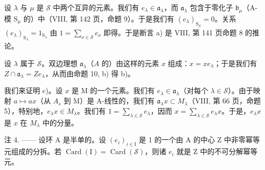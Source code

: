 设 \(\lambda\) 与 \(\mu\) 是 \(\mathcal{S}\) 中两个互异的元素。我们有 \(e_{\lambda} \in \mathfrak{a}_{\lambda}\)，而 \(\mathfrak{a}_{\lambda}\) 包含于零化子 \(\mathfrak{b}_{\mu}\)（A-模 \(\mathrm{S}_{\mu}\) 的）中（VIII, 第 142 页，命题 9）。于是我们有 \((e_{\lambda})_{\mathrm{S}_{\mu}} = 0\)。关系 \((e_{\lambda})_{\mathrm{S}_{\lambda}} = 1_{\mathrm{S}_{\lambda}}\) 由 \(1 = \sum_{\nu \in \mathcal{S}} e_{\nu}\) 即得。于是断言 a) 是 VIII, 第 141 页命题 8 的推论。

设 \(\lambda\) 属于 \(\mathcal{S}\)。双边理想 \(\mathfrak{a}_{\lambda}\)（\(A\) 的）由这样的元素 \(x\) 组成：\(x = xe_{\lambda}\)；于是我们有 \(Z \cap \mathfrak{a}_{\lambda} = Ze_{\lambda}\)，从而由命题 10, b) 得 b)。

我们来证明 c)。设 \(x\) 是 M 的一个元素。我们有 \(e_{\lambda} \in \mathfrak{a}_{\lambda}\)（对每个 \(\lambda \in \mathcal{S}\)）。由于映射 \(a \mapsto ax\)（从 \(A_s\) 到 M）是 A-线性的，我们有 \(\mathfrak{a}_{\lambda}x \subset M_{\lambda}\)（VIII, 第 66 页，命题 5），特别地，\(e_{\lambda}x \in M_{\lambda}\)。我们有 \(1 = \sum_{\lambda \in \mathcal{S}} e_{\lambda}\)，因而 \(x = \sum_{\lambda \in \mathcal{S}} e_{\lambda}x\)。于是，\(e_{\lambda}x\) 是 \(x\) 在 \(M_{\lambda}\) 中的分量。

注 4. —— 设环 A 是半单的。设 \((e_{i})_{i\in\mathrm{I}}\) 是 1 的一个由 A 的中心 Z 中非零幂等元组成的分拆。若 \(\operatorname{Card}(\mathrm{I})=\operatorname{Card}(\mathcal{S})\)，则诸 \(e_{i}\) 就是 Z 中的不可分解幂等元。

